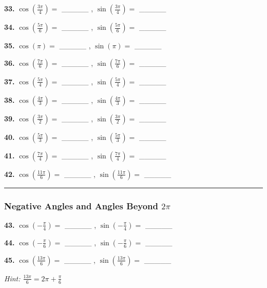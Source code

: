 \documentclass[
  11pt,
]{article}
\begin{document}
\textbf{33.} \(\cos\left(\frac{3\pi}{4}\right) ={}\) \_\_\_\_\_ ,
\(\sin\left(\frac{3\pi}{4}\right) ={}\) \_\_\_\_\_

\textbf{34.} \(\cos\left(\frac{5\pi}{6}\right) ={}\) \_\_\_\_\_ ,
\(\sin\left(\frac{5\pi}{6}\right) ={}\) \_\_\_\_\_

\textbf{35.} \(\cos(\pi) ={}\) \_\_\_\_\_ , \(\sin(\pi) ={}\) \_\_\_\_\_

\textbf{36.} \(\cos\left(\frac{7\pi}{6}\right) ={}\) \_\_\_\_\_ ,
\(\sin\left(\frac{7\pi}{6}\right) ={}\) \_\_\_\_\_

\textbf{37.} \(\cos\left(\frac{5\pi}{4}\right) ={}\) \_\_\_\_\_ ,
\(\sin\left(\frac{5\pi}{4}\right) ={}\) \_\_\_\_\_

\textbf{38.} \(\cos\left(\frac{4\pi}{3}\right) ={}\) \_\_\_\_\_ ,
\(\sin\left(\frac{4\pi}{3}\right) ={}\) \_\_\_\_\_

\textbf{39.} \(\cos\left(\frac{3\pi}{2}\right) ={}\) \_\_\_\_\_ ,
\(\sin\left(\frac{3\pi}{2}\right) ={}\) \_\_\_\_\_

\textbf{40.} \(\cos\left(\frac{5\pi}{3}\right) ={}\) \_\_\_\_\_ ,
\(\sin\left(\frac{5\pi}{3}\right) ={}\) \_\_\_\_\_

\textbf{41.} \(\cos\left(\frac{7\pi}{4}\right) ={}\) \_\_\_\_\_ ,
\(\sin\left(\frac{7\pi}{4}\right) ={}\) \_\_\_\_\_

\textbf{42.} \(\cos\left(\frac{11\pi}{6}\right) ={}\) \_\_\_\_\_ ,
\(\sin\left(\frac{11\pi}{6}\right) ={}\) \_\_\_\_\_

\begin{center}\rule{0.5\linewidth}{0.5pt}\end{center}

\hypertarget{negative-angles-and-angles-beyond-2pi}{%
\subsubsection{\texorpdfstring{Negative Angles and Angles Beyond
\(2\pi\)}{Negative Angles and Angles Beyond 2\textbackslash pi}}\label{negative-angles-and-angles-beyond-2pi}}

\textbf{43.} \(\cos(-\frac{\pi}{4}) ={}\) \_\_\_\_\_ ,
\(\sin(-\frac{\pi}{4}) ={}\) \_\_\_\_\_

\textbf{44.} \(\cos(-\frac{\pi}{6}) ={}\) \_\_\_\_\_ ,
\(\sin(-\frac{\pi}{6}) ={}\) \_\_\_\_\_

\textbf{45.} \(\cos\left(\frac{13\pi}{6}\right) ={}\) \_\_\_\_\_ ,
\(\sin\left(\frac{13\pi}{6}\right) ={}\) \_\_\_\_\_

\emph{Hint: \(\frac{13\pi}{6} = 2\pi + \frac{\pi}{6}\)}
\end{document}
